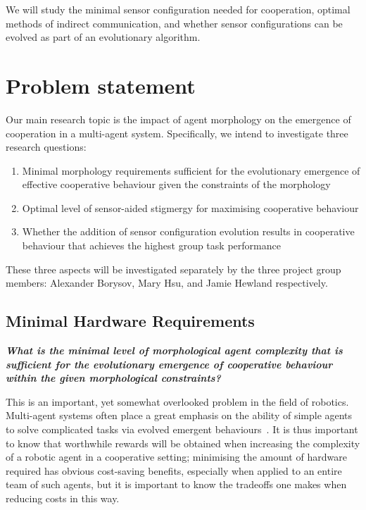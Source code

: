 \documentclass[a4paper,12pt]{article}
\begin{document}
We will study the minimal sensor configuration needed for cooperation, optimal methods of indirect communication, and whether sensor configurations can be evolved as part of an evolutionary algorithm.

\section{Problem statement}
Our main research topic is the impact of agent morphology on the emergence of cooperation in a multi-agent system. Specifically, we intend to investigate three research questions:

\begin{enumerate}
\item Minimal morphology requirements sufficient for the evolutionary emergence of effective cooperative behaviour given the constraints of the morphology
\item Optimal level of sensor-aided stigmergy for maximising cooperative behaviour
\item Whether the addition of sensor configuration evolution results in cooperative behaviour that achieves the highest group task performance
\end{enumerate}

These three aspects will be investigated separately by the three project group members: Alexander Borysov, Mary Hsu, and Jamie Hewland respectively.

\subsection{Minimal Hardware Requirements}

\textbf{ \textit{What is the minimal level of morphological agent complexity that is sufficient for the evolutionary emergence of cooperative behaviour within the given morphological constraints?}}

This is an important, yet somewhat overlooked problem in the field of robotics. Multi-agent systems often place a great emphasis on the ability of simple agents to solve complicated tasks via evolved emergent behaviours~\cite{panait}. It is thus important to know that worthwhile rewards will be obtained when increasing the complexity of a robotic agent in a cooperative setting; minimising the amount of hardware required has obvious cost-saving benefits, especially when applied to an entire team of such agents, but it is important to know the tradeoffs one makes when reducing costs in this way.
\end{document}
